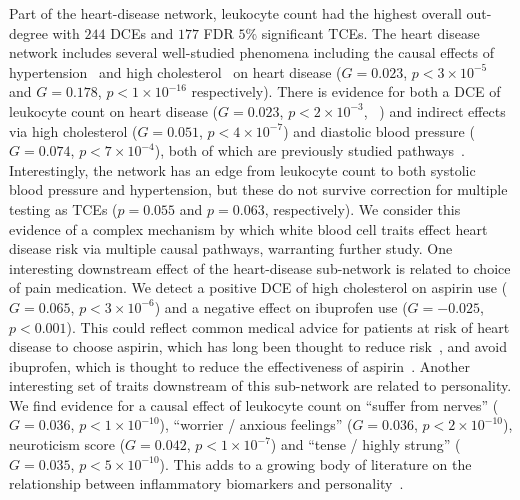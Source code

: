 \documentclass{article}
\begin{document}
Part of the heart-disease network, leukocyte count had the highest overall out-degree with $244$ DCEs
and $177$ FDR $5\%$ significant TCEs. The heart disease network includes several well-studied phenomena
including the causal effects of hypertension~\cite{MacMahon1990} and high cholesterol~\cite{Castelli1992}
on heart disease ($G=0.023$, $p < 3 \times 10^{-5}$ and $G=0.178$, $p < 1 \times 10^{-16}$ respectively).
 There is  evidence for both a DCE of leukocyte count on heart disease
($G=0.023$, $p < 2 \times 10^{-3}$, ~\cite{Lee2001})
and indirect effects via high cholesterol ($G=0.051$, $p < 4 \times 10^{-7}$) and diastolic blood pressure
($G=0.074$, $p < 7 \times 10^{-4}$), both of which are previously studied pathways~\cite{Facchini1992}.
Interestingly, the network has an edge from
leukocyte count to both systolic blood pressure and hypertension, but these do not survive correction
for multiple testing as TCEs ($p = 0.055$ and $p = 0.063$, respectively). We consider this evidence of
a complex mechanism by which white blood cell traits effect heart disease risk via multiple causal pathways,
warranting further study. One interesting downstream effect of the heart-disease sub-network is related
to choice of pain medication. We detect a positive DCE of high cholesterol on aspirin use
($G = 0.065$, $p < 3 \times 10^{-6}$) and a negative effect on ibuprofen use ($G = -0.025$, $p < 0.001$).
This could reflect common medical advice for patients at risk of heart disease to choose aspirin,
which has long been thought to reduce risk~\cite{Sanmuganathan2001}, and avoid ibuprofen, which
is thought to reduce the effectiveness of aspirin~\cite{MacDonald2006}. Another interesting set of traits
downstream of this sub-network are related to personality. We find evidence for a causal effect of
leukocyte count on ``suffer from nerves'' ($G=0.036$, $p < 1 \times 10^{-10}$), ``worrier / anxious feelings'' 
($G=0.036$, $p < 2 \times 10^{-10}$), neuroticism score ($G=0.042$, $p < 1 \times 10^{-7}$)
and ``tense / highly strung'' ($G = 0.035$, $p < 5 \times 10^{-10}$).
This adds to a growing body of literature on the relationship between
inflammatory biomarkers and personality~\cite{Allen2017,Sutin2012}.
\end{document}
